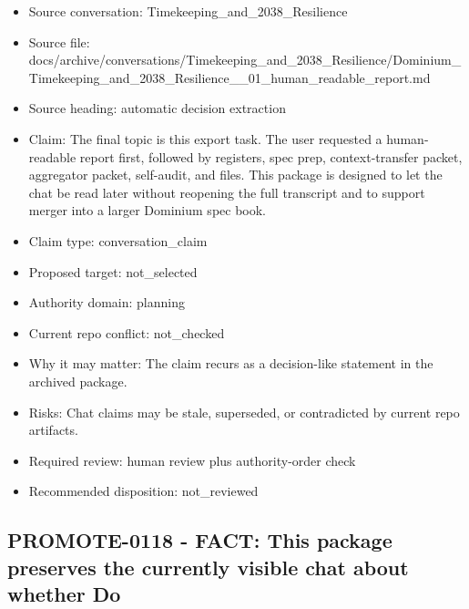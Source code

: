 \documentclass[11pt,a4paper]{report}
\begin{document}
\begin{itemize}
\item Source conversation: Timekeeping\_and\_2038\_Resilience
\item Source file: docs/archive/conversations/Timekeeping\_and\_2038\_Resilience/Dominium\_Timekeeping\_and\_2038\_Resilience\_\_01\_human\_readable\_report.md
\item Source heading: automatic decision extraction
\item Claim: The final topic is this export task. The user requested a human-readable report first, followed by registers, spec prep, context-transfer packet, aggregator packet, self-audit, and files. This package is designed to let the chat be read later without reopening the full transcript and to support merger into a larger Dominium spec book.
\item Claim type: conversation\_claim
\item Proposed target: not\_selected
\item Authority domain: planning
\item Current repo conflict: not\_checked
\item Why it may matter: The claim recurs as a decision-like statement in the archived package.
\item Risks: Chat claims may be stale, superseded, or contradicted by current repo artifacts.
\item Required review: human review plus authority-order check
\item Recommended disposition: not\_reviewed
\end{itemize}

\subsection{PROMOTE-0118 - FACT: This package preserves the currently visible chat about whether Do}
\end{document}
